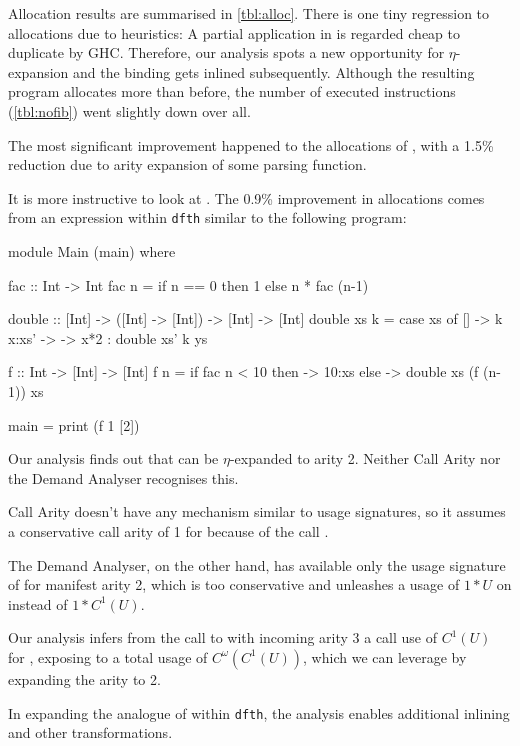 Allocation results are summarised in \cref{tbl:alloc}.
There is one tiny regression to allocations due to heuristics:
A partial application in  is regarded cheap to duplicate by GHC.
Therefore, our analysis spots a new opportunity for $\eta$-expansion and the binding gets inlined subsequently.
Although the resulting program allocates more than before, the number of executed instructions (\cf \cref{tbl:nofib}) went slightly down over all.

The most significant improvement happened to the allocations of , with a 1.5\% reduction due to arity expansion of some parsing function.

It is more instructive to look at . 
The 0.9\% improvement in allocations comes from an expression within \texttt{dfth} similar to the following program:
\begin{haskellcode}
  module Main (main) where

  fac :: Int -> Int
  fac n = 
    if n == 0 
    then 1 
    else n * fac (n-1)

  double :: [Int] -> ([Int] -> [Int]) -> [Int] -> [Int]
  double xs k =
    case xs of
      [] -> k
      x:xs' -> \ys -> x*2 : double xs' k ys

  f :: Int -> [Int] -> [Int]
  f n =
    if fac n < 10
    then \xs -> 10:xs
    else \xs -> double xs (f (n-1)) xs

  main =
    print (f 1 [2])
\end{haskellcode}

Our analysis finds out that  can be $\eta$-expanded to arity 2.
Neither Call Arity nor the Demand Analyser recognises this.

Call Arity doesn't have any mechanism similar to usage signatures, so it assumes a conservative call arity of 1 for  because of the call .

The Demand Analyser, on the other hand, has available only the usage signature of  for manifest arity 2, which is too conservative and unleashes a usage of $1*U$ on  instead of $1*C^1(U)$.

Our analysis infers from the call to  with incoming arity 3 a call use of $C^1(U)$ for , exposing  to a total usage of $C^\omega(C^1(U))$, which we can leverage by expanding the arity to 2.

In expanding the analogue of  within \texttt{dfth}, the analysis enables additional inlining and other transformations.
\smallskip

